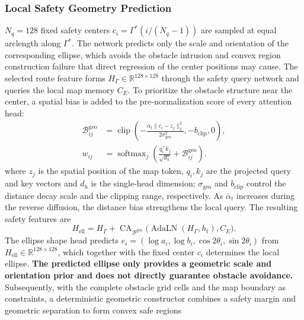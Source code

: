 \documentclass[journal]{IEEEtran}
\newcommand{\R}{\mathbb{R}}
\newcommand{\Ada}{\operatorname{AdaLN}}
\newcommand{\clip}{\operatorname{clip}}
\newcommand{\softmax}{\operatorname{softmax}}
\newcommand{\CA}{\operatorname{CA}}
\newcommand{\baralpha}{\bar{\alpha}}
\begin{document}

\subsubsection{Local Safety Geometry Prediction}

$N_q=128$ fixed safety centers $c_i=\Gamma^*\!\left(i/(N_q-1)\right)$ are sampled at equal arclength along $\Gamma^*$. The network predicts only the scale and orientation of the corresponding ellipse, which avoids the obstacle intrusion and convex region construction failure that direct regression of the center positions may cause. The selected route feature forms $H_\Gamma\in\R^{128\times128}$ through the safety query network and queries the local map memory $C_E$. To prioritize the obstacle structure near the center, a spatial bias is added to the pre-normalization score of every attention head:
\begin{equation}
\begin{aligned}
\mathcal B_{ij}^{\mathrm{geo}}&=\clip\!\left(
-\frac{\baralpha_t\|c_i-z_j\|_2^2}{2\sigma_{\mathrm{geo}}^2},
-b_{\mathrm{clip}},0\right),\\
w_{ij}&=\softmax_j\!\left(
\frac{q_i^{\top}k_j}{\sqrt{d_h}}+\mathcal B_{ij}^{\mathrm{geo}}\right).
\end{aligned}
\end{equation}
where $z_j$ is the spatial position of the map token, $q_i,k_j$ are the projected query and key vectors and $d_h$ is the single-head dimension; $\sigma_{\mathrm{geo}}$ and $b_{\mathrm{clip}}$ control the distance decay scale and the clipping range, respectively. As $\baralpha_t$ increases during the reverse diffusion, the distance bias strengthens the local query. The resulting safety features are
\begin{equation}
H_{\mathrm{ell}}
=H_\Gamma+\CA_{\mathcal B^{\mathrm{geo}}}
\bigl(\Ada(H_\Gamma,h_t),C_E\bigr).
\end{equation}
The ellipse shape head predicts $e_i=(\log a_i,\log b_i,\cos2\theta_i,\sin2\theta_i)$ from $H_{\mathrm{ell}}\in\R^{128\times128}$, which together with the fixed center $c_i$ determines the local ellipse. \textbf{The predicted ellipse only provides a geometric scale and orientation prior and does not directly guarantee obstacle avoidance.} Subsequently, with the complete obstacle grid cells and the map boundary as constraints, a deterministic geometric constructor combines a safety margin and geometric separation to form convex safe regions
\end{document}
